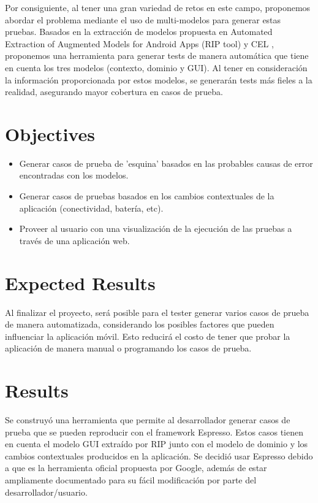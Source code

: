 Por consiguiente, al tener una gran variedad de retos en este campo, proponemos abordar el problema mediante el uso de multi-modelos para generar estas pruebas. Basados en la extracción de modelos propuesta en Automated Extraction of Augmented Models for Android Apps (RIP tool) \cite{LinanAutomatedApps} y CEL \cite{Linares-Vasquez2017ContinuousTesting}, proponemos una herramienta para generar tests de manera automática que tiene en cuenta los tres modelos (contexto, dominio y GUI). Al tener en consideración la información proporcionada por estos modelos, se generarán tests más fieles a la realidad, asegurando mayor cobertura en casos de prueba.

\section{Objectives}

\begin{itemize}
	\item Generar casos de prueba de 'esquina' basados en las probables causas de error encontradas con los modelos.
	\item Generar casos de pruebas basados en los cambios contextuales de la aplicación (conectividad, batería, etc).
	\item Proveer al usuario con una visualización de la ejecución de las pruebas a través de una aplicación web.
\end{itemize}

\section{Expected Results}
Al finalizar el proyecto, será posible para el tester generar varios casos de prueba de manera automatizada, considerando los posibles factores que pueden influenciar la aplicación móvil. Esto reducirá el costo de tener que probar la aplicación de manera manual o programando los casos de prueba.
\section{Results}
Se construyó una herramienta que permite al desarrollador generar casos de prueba que se pueden reproducir con el framework Espresso. Estos casos tienen en cuenta el modelo GUI extraído por RIP junto con el modelo de dominio y los cambios contextuales producidos en la aplicación. Se decidió usar Espresso debido a que es la herramienta oficial propuesta por Google, además de estar ampliamente documentado para su fácil modificación por parte del desarrollador/usuario.
